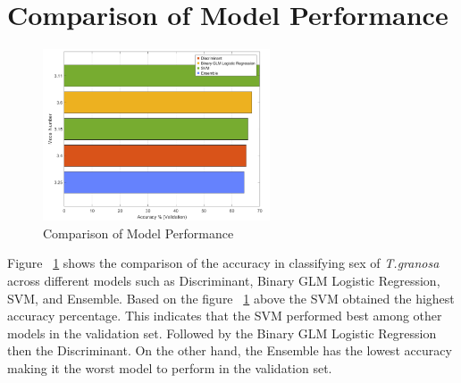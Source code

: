\begin{table}[H]
	\centering
	\caption{ Descriptive statistics of the \Tgranosa features}
	\label{tab:descriptive-stat}
\end{table}




\section{Comparison of Model Performance}
\begin{figure}[!htbp]
	\centering
	\includegraphics[width=0.6\textwidth]{figures/compare-models.png}
	\caption{Comparison of Model Performance}
	\label{fig:compare-models}
\end{figure}

Figure ~\ref{fig:compare-models} shows the comparison of the accuracy in classifying sex of \textit{T.granosa} across different models such as Discriminant, Binary GLM Logistic Regression, SVM, and Ensemble. Based on the figure ~\ref{fig:compare-models} above the SVM obtained the highest accuracy percentage. This indicates that the SVM performed best among other models in the validation set. Followed by the Binary GLM Logistic Regression then the Discriminant. On the other hand, the Ensemble has the lowest accuracy making it the worst model to perform in the validation set. 

